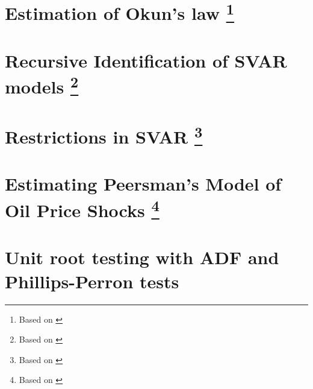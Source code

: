 \documentclass[11pt]{article}
\begin{document}
%
%
%
%
\section{Estimation of Okun's law\texorpdfstring{%
      \protect\footnote{Based on \cite{KissNguyenOesterholm-2023}}%
  }{}}
\label{ex-Okun_law-var}


\section{Recursive Identification of SVAR models\texorpdfstring{%
      \protect\footnote{Based on \cite[][see Section 29, ``Recursively Identified Models By Short-Run Restrictions"]{Mutschler-2018-github_repo}}%
  }{}}


\section{Restrictions in SVAR\texorpdfstring{ %
      \protect\footnote{Based on \cite{MartinHurnHarris-2012,Mutschler-2018-github_repo}} %
  }{}}



\section{Estimating Peersman's Model of Oil Price Shocks\texorpdfstring{ %
      \protect\footnote{Based on \cite{MartinHurnHarris-2012,Mutschler-2018-github_repo}} %
  }{}}



\section{Unit root testing with ADF and Phillips-Perron tests}




\clearpage
\printbibliography
\end{document}
